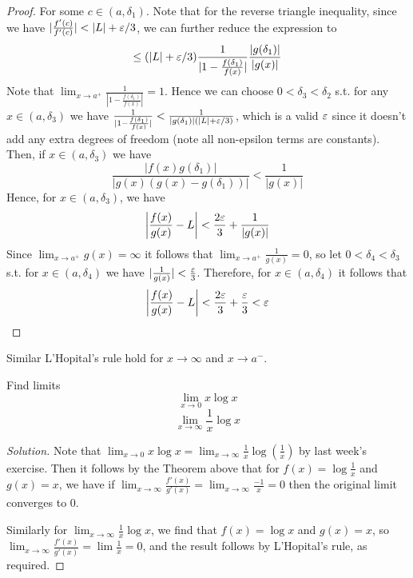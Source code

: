 \begin{proof}
  For some $c\in (a,\delta_1)$. Note that for the reverse triangle inequality, since we
  have $|\frac{f'(c)}{f'(c)}| < |L|+\varepsilon/3$, we can further reduce the expression to 
  \[\leq (|L|+\varepsilon/3)\frac{1}{|1-\frac{f(\delta_1)}{f(x)}|}\frac{|g(\delta_1)|}{|g(x)|}\]
  Note that $\lim_{x\to a^+}\frac{1}{|1-\frac{f(\delta_1)}{f(x)}|} = 1$. Hence we can
  choose $0<\delta_3<\delta_2$ s.t. for any $x\in(a,\delta_3)$ we have
  $\frac{1}{|1-\frac{f(\delta_1)}{f(x)}|} < \frac{1}{|g(\delta_1)|(|L|+\varepsilon/3)}$, which is
  a valid $\varepsilon$ since it doesn't add any extra degrees of freedom (note all non-epsilon
  terms are constants).  Then, if $x\in(a,\delta_3)$ we have
  \[\frac{|f(x)g(\delta_1)|}{|g(x)(g(x)-g(\delta_1))|} < \frac{1}{|g(x)|}\]
  Hence, for $x\in(a,\delta_3)$, we have 
  \[\left| \frac{f(x)}{g(x)}-L \right|< \frac{2\varepsilon}{3} + \frac{1}{|g(x)|}\]
  Since $\lim_{x\to a^+} g(x)=\infty$ it follows that $\lim_{x\to a^+}
  \frac{1}{g(x)}= 0$, so let $0<\delta_4<\delta_3$ s.t. for $x\in(a,\delta_4)$ we have
  $|\frac{1}{g(x)}|< \frac{\varepsilon}{3}$. Therefore, for $x\in(a,\delta_4)$ it follows that 
  \[\left| \frac{f(x)}{g(x)}-L \right| < \frac{2\varepsilon}{3} + \frac{\varepsilon}{3} < \varepsilon\]
  
\end{proof}
\begin{remark}
  Similar L'Hopital's rule hold for $x\to\infty$ and $x\to a^-$.
  \label{<+label+>}
\end{remark}

\begin{exercise}
  Find limits
  \[\lim_{x\to 0} x\log x\]
  \[\lim_{x\to\infty} \frac{1}{x}\log x\]
\end{exercise}
\begin{proof}[Solution]
  Note that $\lim_{x\to 0} x\log x =
  \lim_{x\to\infty}\frac{1}{x}\log(\frac{1}{x})$ by last week's exercise. Then it follows
  by the Theorem above that for $f(x)=\log\frac{1}{x}$ and $g(x)=x$,  we have if
  $\lim_{x\to\infty} \frac{f'(x)}{g'(x)}= \lim_{x\to\infty}\frac{-1}{x} = 0$ then the
  original limit converges to $0$. 

  Similarly for $\lim_{x\to\infty} \frac{1}{x}\log x$, we find that $f(x)=\log x$ and
  $g(x)=x$, so $\lim_{x\to \infty} \frac{f'(x)}{g'(x)} = \lim \frac{1}{x}  = 0$, and the
  result follows by L'Hopital's rule, as required.
\end{proof}
